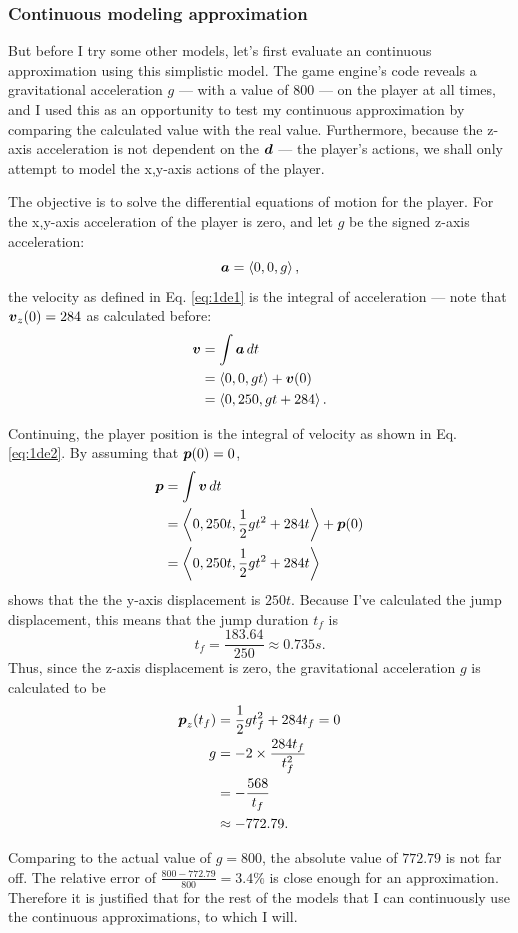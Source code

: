 \subsubsection{Continuous modeling approximation}
But before I try some other models, let's first evaluate an continuous approximation using this simplistic model.
The game engine's code reveals a gravitational acceleration $g$ --- with a value of $800$ --- on the player at all times, and I used this as an opportunity to test my continuous approximation by comparing the calculated value with the real value. Furthermore, because the z-axis acceleration is not dependent on the $\boldsymbol{d}$ --- the player's actions, we shall only attempt to model the x,y-axis actions of the player.

The objective is to solve the differential equations of motion for the player. For the x,y-axis acceleration of the player is zero, and let $g$ be the signed z-axis acceleration:
\[
    \boldsymbol{a} = \left\langle 0, 0, g \right\rangle,
\]
the velocity as defined in Eq. \ref{eq:1de1} is the integral of acceleration --- note that $\boldsymbol{v}_{z}(0) = 284$ as calculated before:
\begin{align*}
    \boldsymbol{v} &= \int \boldsymbol{a} \, dt\\
    &= \left\langle 0, 0, gt \right\rangle + \boldsymbol{v}(0)\\
    &= \left\langle 0, 250, gt + 284 \right\rangle.
\end{align*}

Continuing, the player position is the integral of velocity as shown in Eq. \ref{eq:1de2}. By assuming that $\boldsymbol{p}(0) = 0$,
\begin{align*}
    \boldsymbol{p} &= \int \boldsymbol{v} \, dt\\
    &= \left\langle 0, 250t, \frac{1}{2}gt^2 + 284t \right\rangle + \boldsymbol{p}(0)\\
    &= \left\langle 0, 250t, \frac{1}{2}gt^2 + 284t \right\rangle
\end{align*}
shows that the the y-axis displacement is $250t$. Because I've calculated the jump displacement, this means that the jump duration $t_f$ is
\[
    t_f = \frac{183.64}{250} \approx 0.735 \si{s}.
\]
Thus, since the z-axis displacement is zero, the gravitational acceleration $g$ is calculated to be
\begin{align*}
    \boldsymbol{p}_{z}(t_f) &= \frac{1}{2}gt_f^2 + 284t_f = 0\\
    g &= - 2 \times \frac{284t_f}{t_f^2}\\
    &= -\frac{568}{t_f}\\
    &\approx -772.79.
\end{align*}

Comparing to the actual value of $g=800$, the absolute value of $772.79$ is not far off. The relative error of $\frac{800 - 772.79}{800} = 3.4\%$ is close enough for an approximation. Therefore it is justified that for the rest of the models that I can continuously use the continuous approximations, to which I will.

